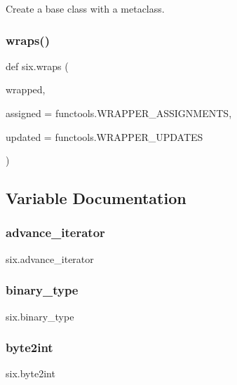 \begin{DoxyVerb}Create a base class with a metaclass.\end{DoxyVerb}
 \mbox{\label{namespacesix_ac61e4b217e98112323ac2335dc9e2e99}} 
\subsubsection{\texorpdfstring{wraps()}{wraps()}}
{\footnotesize\ttfamily def six.\+wraps (\begin{DoxyParamCaption}\item[{}]{wrapped,  }\item[{}]{assigned = {\ttfamily functools.WRAPPER\+\_\+ASSIGNMENTS},  }\item[{}]{updated = {\ttfamily functools.WRAPPER\+\_\+UPDATES} }\end{DoxyParamCaption})}



\subsection{Variable Documentation}
\mbox{\label{namespacesix_a54297b1c9588655ddadf0bd50b85caaa}} 
\subsubsection{\texorpdfstring{advance\+\_\+iterator}{advance\_iterator}}
{\footnotesize\ttfamily six.\+advance\+\_\+iterator}

\mbox{\label{namespacesix_a9063602f8023da63466adbe85113e7e7}} 
\subsubsection{\texorpdfstring{binary\+\_\+type}{binary\_type}}
{\footnotesize\ttfamily six.\+binary\+\_\+type}

\mbox{\label{namespacesix_a34d8d61488b379c61fb59c77498ce964}} 
\subsubsection{\texorpdfstring{byte2int}{byte2int}}
{\footnotesize\ttfamily six.\+byte2int}

